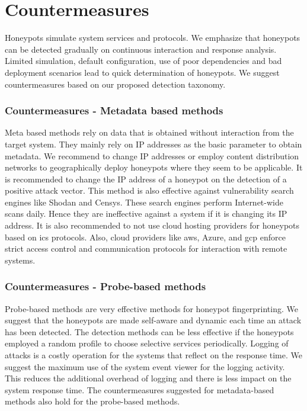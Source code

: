 \section{Countermeasures}
\label{sec:counter}

Honeypots simulate system services and protocols. We emphasize that honeypots can be detected gradually on continuous interaction and response analysis. Limited simulation, default configuration, use of poor dependencies and bad deployment scenarios lead to quick determination of honeypots. We suggest countermeasures based on our proposed detection taxonomy. 

\subsubsection{Countermeasures - Metadata based methods}
Meta based methods rely on data that is obtained without interaction from the target system. They mainly rely on IP addresses as the basic parameter to obtain metadata. We recommend to change IP addresses or employ content distribution networks to geographically deploy honeypots where they seem to be applicable.  It is recommended to change the IP address of a honeypot on the detection of a positive attack vector. This method is also effective against vulnerability search engines like Shodan and Censys. These search engines perform Internet-wide scans daily. Hence they are ineffective against a system if it is changing its IP address. It is also recommended to not use cloud hosting providers for honeypots based on \acrshort{ics} protocols. Also, cloud providers like \acrshort{aws}, Azure, and \acrshort{gcp} enforce strict access control and communication protocols for interaction with remote systems. 


\subsubsection{Countermeasures - Probe-based methods}
Probe-based methods are very effective methods for honeypot fingerprinting. We suggest that the honeypots are made self-aware and dynamic each time an attack has been detected. The detection methods can be less effective if the honeypots employed a random profile to choose selective services periodically.  Logging of attacks is a costly operation for the systems that reflect on the response time. We suggest the maximum use of the system event viewer for the logging activity. This reduces the additional overhead of logging and there is less impact on the system response time. The countermeasures suggested for metadata-based methods also hold for the probe-based methods. 

